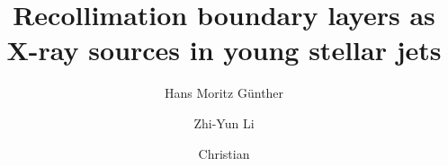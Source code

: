 \documentclass{emulateapj}
\begin{document}

\title{Recollimation boundary layers as X-ray sources in young stellar jets}



\author{Hans Moritz G{\"{u}}nther}
 
\author{Zhi-Yun Li}
 
\author{Christian}




\end{document}
